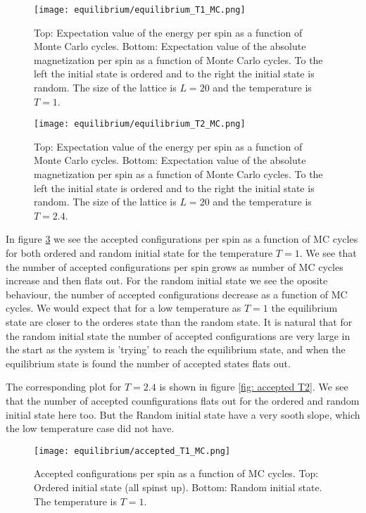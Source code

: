 \documentclass[11pt,a4wide]{article}
\begin{document}
\begin{figure}[htp]
\centering
\texttt{[image: equilibrium/equilibrium\_T1\_MC.png]}
\caption{Top: Expectation value of the energy per spin as a function of Monte Carlo cycles. Bottom:  Expectation value of the absolute magnetization per spin as a function of Monte Carlo cycles. To the left the initial state is ordered and to the right the initial state is random. The size of the lattice is $L=20$ and the temperature is $T=1$.}
\label{fig: equilibrium T1}
\end{figure}

\begin{figure}[htp]
\centering
\texttt{[image: equilibrium/equilibrium\_T2\_MC.png]}
\caption{Top: Expectation value of the energy per spin as a function of Monte Carlo cycles. Bottom:  Expectation value of the absolute magnetization per spin as a function of Monte Carlo cycles. To the left the initial state is ordered and to the right the initial state is random. The size of the lattice is $L=20$ and the temperature is $T=2.4$.}
\label{fig: equilibrium T2}
\end{figure}

In figure \ref{fig: accepted T1} we see the accepted configurations per spin as a function of MC cycles for both ordered and random initial state for the temperature $T=1$. We see that the number of accepted configurations per spin grows as number of MC cycles increase and then flats out. For the random initial state we see the oposite behaviour, the number of accepted configurations decrease as a function of MC cycles. We would expect that for a low temperature as $T=1$ the equilibrium state are closer to the orderes state than the random state. It is natural that for the random initial state the number of accepted configurations are very large in the start as the system is 'trying' to reach the equilibrium state, and when the equilibrium state is found the number of accepted states flats out. 

The corresponding plot for $T=2.4$ is shown in figure \ref{fig:  accepted T2}. We see that the number of accepted counfigurations flats out for the ordered and random initial state here too. But the Random initial state have a very sooth slope, which the low temperature case did not have. 


\begin{figure}[htp]
\texttt{[image: equilibrium/accepted\_T1\_MC.png]}
\caption{Accepted configurations per spin as a function of MC cycles. Top: Ordered initial state (all spinst up). Bottom: Random initial state. The temperature is $T=1$.}
\centering
\label{fig: accepted T1}
\end{figure}
\end{document}
